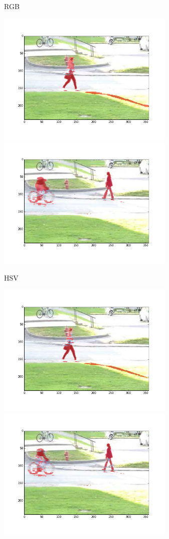 \documentclass[12pt, a4paper]{article}
\begin{document}
			RGB
			\begin{center}	
				\includegraphics[width=8.5cm]{3_par_rgb_vid_0.png}
				\includegraphics[width=8.5cm]{3_par_rgb_vid_1.png}
			\end{center}

			HSV
			\begin{center}
				\includegraphics[width=8.5cm]{3_par_hsv_vid_0.png}
				\includegraphics[width=8.5cm]{3_par_hsv_vid_1.png}
			\end{center}
\end{document}
